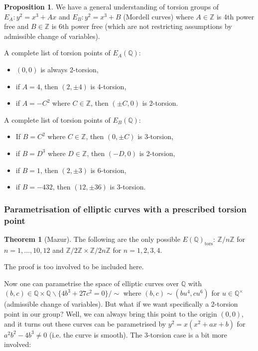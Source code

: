 \documentclass{article}
\newcommand{\Z}{\mathbb{Z}}
\newcommand{\Q}{\mathbb{Q}}
\theoremstyle{definition}
\newtheorem{prop}[defn]{Proposition}
\newtheorem{thm}[defn]{Theorem}
\begin{document}
\begin{prop}
We have a general understanding of torsion groups of $E_A:y^2=x^3+Ax$ and $E_B:y^2=x^3+B$ (Mordell curves) where $A\in\Z$ is 4th power free and $B\in\Z$ is 6th power free (which are not restricting assumptions by admissible change of variables).

A complete list of torsion points of $E_A(\Q)$:
\begin{itemize}
\item $(0,0)$ is always 2-torsion,
\item if $A=4$, then $(2,\pm 4)$ is 4-torsion,
\item if $A=-C^2$ where $C\in\Z$, then $(\pm C,0)$ is 2-torsion.
\end{itemize}

A complete list of torsion points of $E_B(\Q)$:
\begin{itemize}
\item If $B=C^2$ where $C\in\Z$, then $(0,\pm C)$ is 3-torsion,
\item if $B=D^3$ where $D\in\Z$, then $(-D,0)$ is 2-torsion,
\item if $B=1$, then $(2,\pm 3)$ is 6-torsion,
\item if $B=-432$, then $(12,\pm 36)$ is 3-torsion.
\end{itemize}
\end{prop}

\subsubsection{Parametrisation of elliptic curves with a prescribed torsion point}
\begin{thm}[Mazur]
The following are the only possible $E(\Q)_{\operatorname{tors}}$: $\Z/n\Z$ for $n=1,\ldots,10,12$ and $\Z/2\Z\times\Z/2n\Z$ for $n=1,2,3,4$.
\end{thm}
The proof is too involved to be included here.

Now one can parametrise the space of elliptic curves over $\Q$ with $(b,c)\in\Q\times\Q\backslash\{4b^3+27c^2=0\}/\sim$ where $(b,c)\sim (bu^4,cu^6)$ for $u\in\Q^\times$ (admissible change of variables). But what if we want specifically a 2-torsion point in our group? Well, we can always bring this point to the origin $(0,0)$, and it turns out these curves can be parametrised by $y^2=x(x^2+ax+b)$ for $a^2b^2-4b^3\neq 0$ (i.e. the curve is smooth). The 3-torsion case is a bit more involved:
\end{document}
